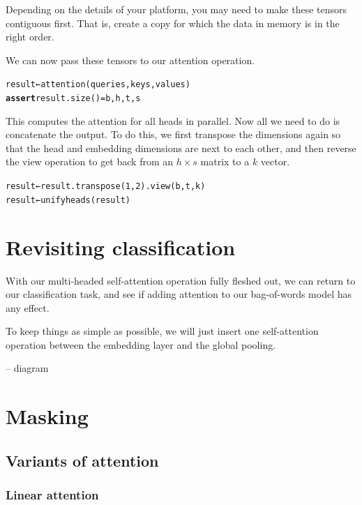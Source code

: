 \documentclass{pca}
\newenvironment{aside}{
	\setlength{\leftskip}{1em}\par\itshape
}{
	
	\setlength{\leftskip}{0em}\par
}
\newcommand{\gc}[1]{{\color{my-green} #1}}
\newcommand{\rc}[1]{{\color{my-red} #1}}
\newcommand{\bc}[1]{{\color{my-blue} #1}}
\theoremstyle{theorem}
\theoremstyle{definition}
\theoremstyle{proof}
\begin{document}
\begin{aside}
Depending on the details of your platform, you may need to make these tensors contiguous first. That is, create a copy for which the data in memory is in the right order.
\end{aside}

We can now pass these tensors to our attention operation.

\begin{alltt}
result ← attention(\bc{queries}, \gc{keys}, \rc{values})
\textbf{assert} result.size() = b, h, t, s
\end{alltt}

This computes the attention for all heads in parallel. Now all we need to do is concatenate the output. To do this, we first transpose the dimensions again so that the head and embedding dimensions are next to each other, and then reverse the view operation to get back from an $h \times s$ matrix to a $k$ vector.

\begin{alltt}
result ← result.transpose(1,2).view(b, t, k)
result ← unifyheads(result)
\end{alltt}


\section{Revisiting classification}

With our multi-headed self-attention operation fully fleshed out, we can return to our classification task, and see if adding attention to our bag-of-words model has any effect.

To keep things as simple as possible, we will just insert one self-attention operation between the embedding layer and the global pooling. 

-- diagram


\section{Masking}

\subsection{Variants of attention}

\subsubsection{Linear attention}
\end{document}
